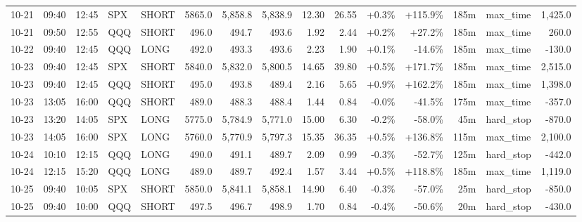 \documentclass[11pt,a4paper,twoside]{article}
\begin{document}
\begin{landscape}
\begin{center}
\begin{longtable}{>{\color{txtmain}}l l l l l r r r r r r r r >{\color{txtmain}}l r}
10-21 & 09:40 & 12:45 & SPX & SHORT & 5865.0 & 5,858.8 & 5,838.9 & 12.30 & 26.55 & \textcolor{wingreen}{+0.3\%} & \textcolor{wingreen}{+115.9\%} & 185m & max\_time & \textcolor{wingreen}{1,425.0} \\
10-21 & 09:50 & 12:55 & QQQ & SHORT & 496.0 & 494.7 & 493.6 & 1.92 & 2.44 & \textcolor{wingreen}{+0.2\%} & \textcolor{wingreen}{+27.2\%} & 185m & max\_time & \textcolor{wingreen}{260.0} \\
10-22 & 09:40 & 12:45 & QQQ & LONG & 492.0 & 493.3 & 493.6 & 2.23 & 1.90 & \textcolor{wingreen}{+0.1\%} & \textcolor{lossred}{-14.6\%} & 185m & max\_time & \textcolor{lossred}{-130.0} \\
10-23 & 09:40 & 12:45 & SPX & SHORT & 5840.0 & 5,832.0 & 5,800.5 & 14.65 & 39.80 & \textcolor{wingreen}{+0.5\%} & \textcolor{wingreen}{+171.7\%} & 185m & max\_time & \textcolor{wingreen}{2,515.0} \\
10-23 & 09:40 & 12:45 & QQQ & SHORT & 495.0 & 493.8 & 489.4 & 2.16 & 5.65 & \textcolor{wingreen}{+0.9\%} & \textcolor{wingreen}{+162.2\%} & 185m & max\_time & \textcolor{wingreen}{1,398.0} \\
10-23 & 13:05 & 16:00 & QQQ & SHORT & 489.0 & 488.3 & 488.4 & 1.44 & 0.84 & \textcolor{lossred}{-0.0\%} & \textcolor{lossred}{-41.5\%} & 175m & max\_time & \textcolor{lossred}{-357.0} \\
10-23 & 13:20 & 14:05 & SPX & LONG & 5775.0 & 5,784.9 & 5,771.0 & 15.00 & 6.30 & \textcolor{lossred}{-0.2\%} & \textcolor{lossred}{-58.0\%} & 45m & hard\_stop & \textcolor{lossred}{-870.0} \\
10-23 & 14:05 & 16:00 & SPX & LONG & 5760.0 & 5,770.9 & 5,797.3 & 15.35 & 36.35 & \textcolor{wingreen}{+0.5\%} & \textcolor{wingreen}{+136.8\%} & 115m & max\_time & \textcolor{wingreen}{2,100.0} \\
10-24 & 10:10 & 12:15 & QQQ & LONG & 490.0 & 491.1 & 489.7 & 2.09 & 0.99 & \textcolor{lossred}{-0.3\%} & \textcolor{lossred}{-52.7\%} & 125m & hard\_stop & \textcolor{lossred}{-442.0} \\
10-24 & 12:15 & 15:20 & QQQ & LONG & 489.0 & 489.7 & 492.4 & 1.57 & 3.44 & \textcolor{wingreen}{+0.5\%} & \textcolor{wingreen}{+118.8\%} & 185m & max\_time & \textcolor{wingreen}{1,119.0} \\
10-25 & 09:40 & 10:05 & SPX & SHORT & 5850.0 & 5,841.1 & 5,858.1 & 14.90 & 6.40 & \textcolor{lossred}{-0.3\%} & \textcolor{lossred}{-57.0\%} & 25m & hard\_stop & \textcolor{lossred}{-850.0} \\
10-25 & 09:40 & 10:00 & QQQ & SHORT & 497.5 & 496.7 & 498.9 & 1.70 & 0.84 & \textcolor{lossred}{-0.4\%} & \textcolor{lossred}{-50.6\%} & 20m & hard\_stop & \textcolor{lossred}{-430.0} \\

\end{longtable}
\end{center}
\end{landscape}
\end{document}
